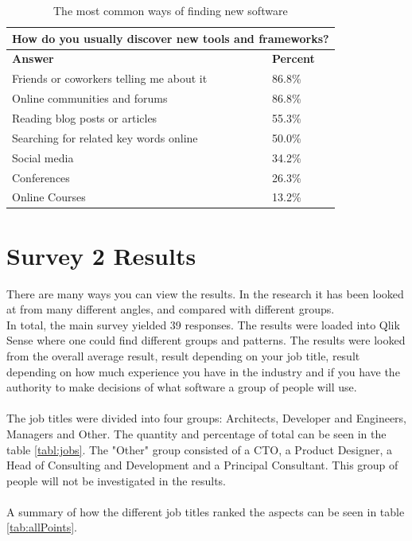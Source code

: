 \documentclass{cslthse-msc}
\begin{document}
    \begin{table}[H]
        \centering
        \caption{The most common ways of finding new software}
        \label{tab:discover}
        \begin{tabularx}{\columnwidth}{X|l}
            \multicolumn{2}{c}{\textbf{How do you usually discover new tools and frameworks?}} \\ \hline \hline
            \textbf{Answer} & \textbf{Percent} \\ \hline
            Friends or coworkers telling me about it	&	86.8\% \\
            Online communities and forums	&	86.8\% \\
            Reading blog posts or articles	&	55.3\% \\
            Searching for related key words online	&	50.0\% \\
            Social media	&	34.2\% \\
            Conferences	&	26.3\% \\
            Online Courses	&	13.2\% \\ \hline
        \end{tabularx}
    \end{table}

    \section{Survey 2 Results}
    There are many ways you can view the results. In the research it has been looked at from many different angles, and compared with different groups. \\
    In total, the main survey yielded 39 responses. The results were loaded into Qlik Sense
    where one could find different groups and patterns. The results were looked from the overall average result, result depending
    on your job title, result depending on how much experience you have in the industry and if you have the authority to make decisions of what software a group of people will use.
    \\ \\
    The job titles were divided into four groups: Architects, Developer and
    Engineers, Managers and Other. The quantity and percentage of total can
    be seen in the table \ref{tabl:jobs}. The "Other" group consisted of a CTO, a Product Designer, a Head of Consulting and Development and a Principal Consultant. This group of people will not be investigated in the results. \\ \\
    A summary of how the different job titles ranked the aspects can be seen in table \ref{tab:allPoints}.
\end{document}
